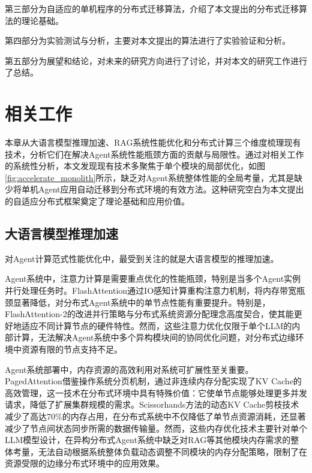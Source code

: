 第三部分为自适应的单机程序的分布式迁移算法，介绍了本文提出的分布式迁移算法的理论基础。

第四部分为实验测试与分析，主要对本文提出的算法进行了实验验证和分析。

第五部分为展望和结论，对未来的研究方向进行了讨论，并对本文的研究工作进行了总结。


\chapter{相关工作}

本章从大语言模型推理加速、RAG系统性能优化和分布式计算三个维度梳理现有技术，分析它们在解决Agent系统性能瓶颈方面的贡献与局限性。通过对相关工作的系统性分析，本文发现现有技术多聚焦于单个模块的局部优化，如图\ref{fig:accelerate_monolith}所示，缺乏对Agent系统整体性能的全局考量，尤其是缺少将单机Agent应用自动迁移到分布式环境的有效方法。这种研究空白为本文提出的自适应分布式框架奠定了理论基础和应用价值。

\section{大语言模型推理加速}
对Agent计算范式性能优化中，最受到关注的就是大语言模型的推理加速。

Agent系统中，注意力计算是需要重点优化的性能瓶颈，特别是当多个Agent实例并行处理任务时。FlashAttention\cite{NEURIPS2022_67d57c32}通过IO感知计算重构注意力机制，将内存带宽瓶颈显著降低，对分布式Agent系统中的单节点性能有重要提升。特别是，FlashAttention-2\cite{dao2023flashattention2fasterattentionbetter}的改进并行策略与分布式系统资源分配理念高度契合，使其能更好地适应不同计算节点的硬件特性。然而，这些注意力优化仅限于单个LLM的内部计算，无法解决Agent系统中多个异构模块间的协同优化问题，对分布式边缘环境中资源有限的节点支持不足。

Agent系统部署中，内存资源的高效利用对系统可扩展性至关重要。PagedAttention\cite{10.1145/3600006.3613165}借鉴操作系统分页机制，通过非连续内存分配实现了KV Cache的高效管理，这一技术在分布式环境中具有特殊价值：它使单节点能够处理更多并发请求，降低了扩展集群规模的需求。Scissorhands方法\cite{NEURIPS2023_a452a7c6}的动态KV Cache剪枝技术减少了高达70\%的内存占用，在分布式系统中不仅降低了单节点资源消耗，还显著减少了节点间状态同步所需的数据传输量。然而，这些内存优化技术主要针对单个LLM模型设计，在异构分布式Agent系统中缺乏对RAG等其他模块内存需求的整体考量，无法自动根据系统整体负载动态调整不同模块的内存分配策略，限制了在资源受限的边缘分布式环境中的应用效果。

